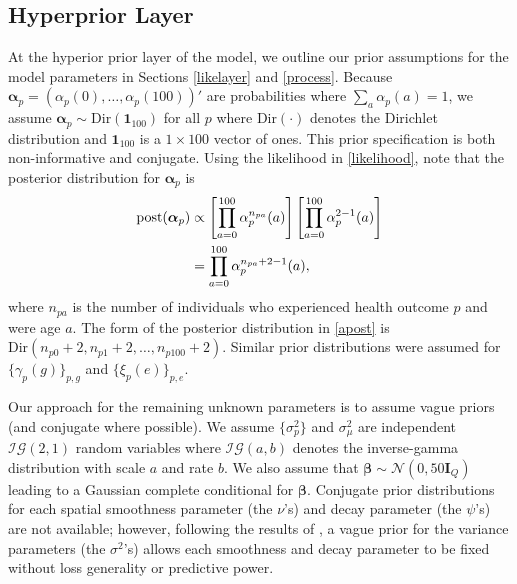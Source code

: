 \documentclass[final]{statsoc}
\begin{document}
\subsection{Hyperprior Layer}
At the hyperior prior layer of the model, we outline our prior assumptions for the model 
parameters in Sections \ref{likelayer} and \ref{process}. Because $\boldsymbol{\alpha}_p = 
(\alpha_p(0),\dots,\alpha_p(100))'$ are probabilities where $\sum_a \alpha_p(a) = 1$, 
we assume $\boldsymbol{\alpha}_{p} \sim \text{Dir}(\mathbf{1}_{100})$ for all $p$ where 
$\text{Dir}(\cdot)$ denotes the Dirichlet distribution and $\mathbf{1}_{100}$ is a $1\times 100$ vector of ones. This prior specification is both non-informative and conjugate. 
Using the likelihood in \eqref{likelihood}, note that the posterior distribution for 
$\boldsymbol{\alpha}_p$ is
\begin{align}
\text{post}(\boldsymbol{\alpha}_p) &\propto \left[\prod_{a=0}^{100} \alpha_p^{n_{pa}}(a)\right]
\left[\prod_{a=0}^{100}\alpha_p^{2-1}(a)\right] \notag \\
&= \prod_{a=0}^{100} \alpha_p^{n_{pa}+2-1}(a),
\label{apost}
\end{align} 
where $n_{pa}$ is the number of individuals who experienced health outcome $p$ and were age 
$a$. The form of the posterior distribution in \eqref{apost} is $\text{Dir}(n_{p0}+2,n_{p1}+2,
\dots,n_{p100}+2)$. Similar prior distributions were assumed for $\{\gamma_p(g)\}_{p,g}$ 
and $\{\xi_p(e)\}_{p,e}$.

Our approach for the remaining unknown parameters is to assume vague priors (and conjugate 
where possible). We assume $\{\sigma^2_p\}$ and $\sigma^2_\mu$ are independent 
$\mathcal{IG}\left(2, 1\right)$ 
random variables where $\mathcal{IG}(a,b)$ denotes the inverse-gamma distribution with scale 
$a$ and rate $b$. We also assume that $\boldsymbol{\beta} \sim 
\mathcal{N}(0, 50\mathbf{I}_{Q})$ leading to a Gaussian complete conditional for $\boldsymbol{\beta}$.  
Conjugate prior distributions for each spatial smoothness parameter (the $\nu$'s) and decay 
parameter (the $\psi$'s) are not available; however, following the results of \cite{Zhang2004}, 
a vague prior for the variance parameters (the $\sigma^2$'s) allows each smoothness and decay 
parameter to be fixed without loss generality or predictive power.
\end{document}
